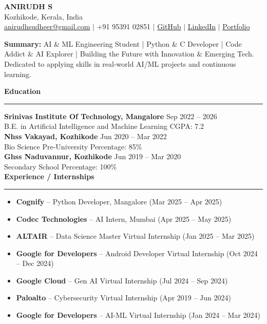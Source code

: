 \documentclass[a4paper]{article}
\newcommand{\resumesection}[1]{\vspace{8pt}\textbf{\large\color{blue}#1}\vspace{2pt}\hrule\vspace{4pt}}
\newenvironment{resumebullets}{\begin{itemize}[leftmargin=*,itemsep=2pt,topsep=2pt]}{\end{itemize}}
\newcommand{\resumecontact}[3]{
  \begin{center}
    {\Huge\bfseries #1}\\
    #2 \\ #3
  \end{center}
}
\begin{document}
\vspace*{-30pt}


\resumecontact{ANIRUDH S}{Kozhikode, Kerala, India}{\href{mailto:anirudhsudheer@gmail.com}{anirudhsudheer@gmail.com} $\vert$ +91 95391 02851 $\vert$ \href{https://github.com/SudoAnirudh}{GitHub} $\vert$ \href{https://www.linkedin.com/in/sudoanirudh/}{LinkedIn} $\vert$ \href{http://bit.ly/3Du0xXP}{Portfolio}}

\vspace{2pt}
\noindent\textbf{Summary:} AI \& ML Engineering Student | Python \& C Developer | Code Addict \& AI Explorer | Building the Future with Innovation \& Emerging Tech. Dedicated to applying skills in real-world AI/ML projects and continuous learning.

\resumesection{Education}
\textbf{Srinivas Institute Of Technology, Mangalore} \hfill Sep 2022 -- 2026\\
B.E. in Artificial Intelligence and Machine Learning \hfill CGPA: 7.2\\
\textbf{Nhss Vakayad, Kozhikode} \hfill Jun 2020 -- Mar 2022\\
Bio Science Pre-University \hfill Percentage: 85\%\\
\textbf{Ghss Naduvannur, Kozhikode} \hfill Jun 2019 -- Mar 2020\\
Secondary School \hfill Percentage: 100\%\\

\resumesection{Experience / Internships}
\begin{resumebullets}
  \item \textbf{Cognify} -- Python Developer, Mangalore (Mar 2025 -- Apr 2025)
  \item \textbf{Codec Technologies} -- AI Intern, Mumbai (Apr 2025 -- May 2025)
  \item \textbf{ALTAIR} -- Data Science Master Virtual Internship (Jan 2025 -- Mar 2025)
  \item \textbf{Google for Developers} -- Android Developer Virtual Internship (Oct 2024 -- Dec 2024)
  \item \textbf{Google Cloud} -- Gen AI Virtual Internship (Jul 2024 -- Sep 2024)
  \item \textbf{Paloalto} -- Cybersecurity Virtual Internship (Apr 2019 -- Jun 2024)
  \item \textbf{Google for Developers} -- AI-ML Virtual Internship (Jan 2024 -- Mar 2024)
\end{resumebullets}
\end{document}
